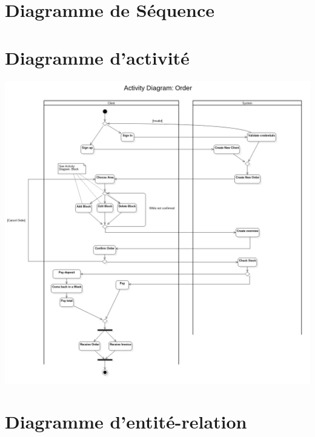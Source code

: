 \documentclass{ecam}
\begin{document}
\section{Diagramme de Séquence}

\section{Diagramme d'activité}

\begin{center}
\includegraphics[angle=0,scale=0.3]{images/activity-diagram.png}
\end{center}

\section{Diagramme d'entité-relation}
\end{document}
